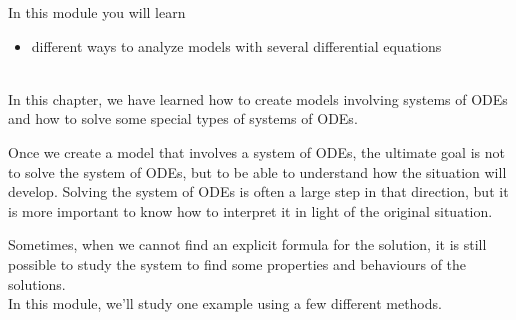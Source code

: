In this module you will learn
\begin{itemize}
	\item different ways to analyze models with several differential equations
\end{itemize}

\hfill \\



In this chapter, we have learned how to create models involving systems of ODEs and how to solve some special types of systems of ODEs.

Once we create a model that involves a system of ODEs, the ultimate goal is not to solve the system of ODEs, but to be able to understand how the situation will develop.
Solving the system of ODEs is often a large step in that direction, but it is more important to know how to interpret it in light of the original situation.

Sometimes, when we cannot find an explicit formula for the solution, it is still possible to study the system to find some properties and behaviours of the solutions. \\

In this module, we'll study one example using a few different methods.


